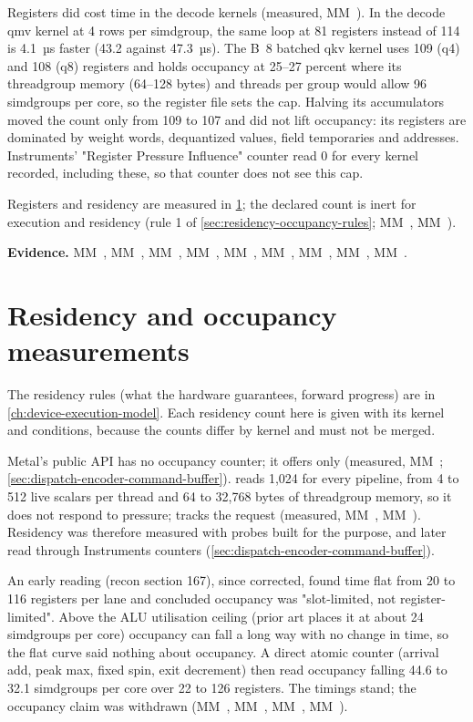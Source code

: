 Registers did cost time in the decode kernels (measured, MM~). In the decode qmv kernel at 4 rows per simdgroup, the same
loop at 81 registers instead of 114 is 4.1~µs faster (43.2 against 47.3~µs). The B~8 batched qkv kernel uses 109 (q4)
and 108 (q8) registers and holds occupancy at 25–27 percent where its threadgroup memory (64–128 bytes) and
threads per group would allow 96 simdgroups per core, so the register file sets the cap. Halving its accumulators moved the
count only from 109 to 107 and did not lift occupancy: its registers are dominated by weight words, dequantized values,
field temporaries and addresses. Instruments' "Register Pressure Influence" counter read 0 for every kernel recorded,
including these, so that counter does not see this cap.

Registers and residency are measured in \cref{sec:residency-occupancy-measurements}; the declared count is inert for execution and residency
(rule 1 of \cref{sec:residency-occupancy-rules}; MM~, MM~).

\textbf{Evidence.} MM~, MM~, MM~, MM~, MM~, MM~, MM~, MM~, MM~.

\section{Residency and occupancy measurements}\label{sec:residency-occupancy-measurements}

The residency rules (what the hardware guarantees, forward progress) are in \cref{ch:device-execution-model}. Each residency
count here is given with its kernel and conditions, because the counts differ by kernel and must not be merged.

Metal's public API has no occupancy counter; it offers only  (measured, MM~; \cref{sec:dispatch-encoder-command-buffer}).
 reads 1,024 for every pipeline,
from 4 to 512 live scalars per thread and 64 to 32,768 bytes of threadgroup memory, so it does not respond to pressure;
 tracks the request (measured, MM~, MM~). Residency was therefore measured with probes
built for the purpose, and later read through Instruments counters (\cref{sec:dispatch-encoder-command-buffer}).

An early reading (recon section 167), since corrected, found time flat from 20 to 116
registers per lane and concluded occupancy was "slot-limited, not register-limited". Above the ALU utilisation
ceiling (prior art places it at about 24 simdgroups per core) occupancy can fall a long way with no change in time, so
the flat curve said nothing about occupancy. A direct atomic counter (arrival add, peak max, fixed spin,
exit decrement) then read occupancy falling 44.6 to 32.1 simdgroups per core over 22 to 126 registers. The timings
stand; the occupancy claim was withdrawn (MM~, MM~, MM~, MM~).

